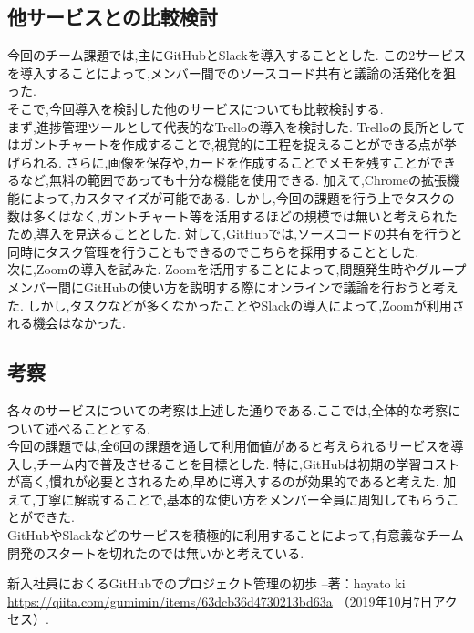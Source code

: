 \documentclass[uplatex,12pt]{jsarticle}
\begin{document}
\subsection{他サービスとの比較検討}
今回のチーム課題では,主にGitHubとSlackを導入することとした.
この2サービスを導入することによって,メンバー間でのソースコード共有と議論の活発化を狙った. \\
そこで,今回導入を検討した他のサービスについても比較検討する. \\
まず,進捗管理ツールとして代表的なTrelloの導入を検討した.
Trelloの長所としてはガントチャートを作成することで,視覚的に工程を捉えることができる点が挙げられる.
さらに,画像を保存や,カードを作成することでメモを残すことができるなど,無料の範囲であっても十分な機能を使用できる.
加えて,Chromeの拡張機能によって,カスタマイズが可能である.
しかし,今回の課題を行う上でタスクの数は多くはなく,ガントチャート等を活用するほどの規模では無いと考えられたため,導入を見送ることとした.
対して,GitHubでは,ソースコードの共有を行うと同時にタスク管理を行うこともできるのでこちらを採用することとした. \\
次に,Zoomの導入を試みた.
Zoomを活用することによって,問題発生時やグループメンバー間にGitHubの使い方を説明する際にオンラインで議論を行おうと考えた.
しかし,タスクなどが多くなかったことやSlackの導入によって,Zoomが利用される機会はなかった.

\subsection{考察}
各々のサービスについての考察は上述した通りである.ここでは,全体的な考察について述べることとする. \\
今回の課題では,全6回の課題を通して利用価値があると考えられるサービスを導入し,チーム内で普及させることを目標とした.
特に,GitHubは初期の学習コストが高く,慣れが必要とされるため,早めに導入するのが効果的であると考えた.
加えて,丁寧に解説することで,基本的な使い方をメンバー全員に周知してもらうことができた. \\
GitHubやSlackなどのサービスを積極的に利用することによって,有意義なチーム開発のスタートを切れたのでは無いかと考えている.


\begin{thebibliography}{99}
 新入社員におくるGitHubでのプロジェクト管理の初歩 --著：hayato ki \\
\url{https://qiita.com/gumimin/items/63dcb36d4730213bd63a} （2019年10月7日アクセス）.

\end{thebibliography}
\end{document}
